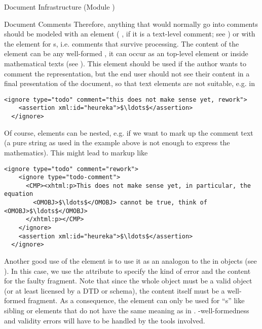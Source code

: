 \begin{tchapter}[id=omdoc-infrastructure,short=Document Infrastructure]{Document Infrastructure (Module {})}
\begin{tsection}[id=comments]{Document Comments}
  Therefore, anything that would normally go into comments should be modeled with an
  {} element ({} {},
  if it is a text-level comment; see {}) or with the {}
  element for {s}, i.e.  comments that survive processing.
  The content of the {} element can be any well-formed {\omdoc}, it can
  occur as an {\omdoc} top-level element or inside mathematical texts (see
  {}). This element should be used if the author wants to comment the
  {\omdoc} representation, but the end user should not see their content in a final
  presentation of the document, so that {\omdoc} text elements are not suitable, e.g. in

\begin{lstlisting}[numbers=none,index={ignore},mathescape]
  <ignore type="todo" comment="this does not make sense yet, rework">
    <assertion xml:id="heureka">$\ldots$</assertion>
  </ignore>
\end{lstlisting}

Of course, {} elements can be nested, e.g. if we want to mark up
the comment text (a pure string as used in the example above is not enough to
express the mathematics). This might lead to markup like 

\begin{lstlisting}[label=nested-ignore,numbers=none,index={ignore},mathescape]
  <ignore type="todo" comment="rework">
    <ignore type="todo-comment">
      <CMP><xhtml:p>This does not make sense yet, in particular, the equation 
        <OMOBJ>$\ldots$</OMOBJ> cannot be true, think of <OMOBJ>$\ldots$</OMOBJ>
      </xhtml:p></CMP>
    </ignore>
    <assertion xml:id="heureka">$\ldots$</assertion>
  </ignore>
\end{lstlisting}

Another good use of the {} element is to use it as an analogon to the
{} in {\openmath} objects (see
{}). In this case, we use the {} attribute to
specify the kind of error and the content for the faulty {\omdoc} fragment. Note that
since the whole object must be a valid {\omdoc} object (or at least licensed by a DTD or
schema), the content itself must be a well-formed {\omdoc} fragment. As a consequence, the
{} element can only be used for ``{s}'' like
sibling {} or {} elements that do not have the same meaning as
in {}. {\xml}-well-formedness and validity errors will have to be
handled by the {\xml} tools involved.


\end{tsection}
\end{tchapter}
